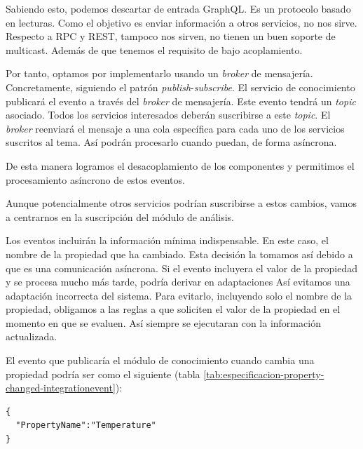 Sabiendo esto, podemos descartar de entrada GraphQL. Es un protocolo basado en lecturas. Como el objetivo es enviar información a otros servicios, no nos sirve. Respecto a RPC y REST, tampoco nos sirven, no tienen un buen soporte de multicast. Además de que tenemos el requisito de bajo acoplamiento.

Por tanto, optamos por implementarlo usando un \emph{broker} de mensajería. Concretamente, siguiendo el patrón \emph{publish}-\emph{subscribe}. El servicio de conocimiento publicará el evento a través del \emph{broker} de mensajería. Este evento tendrá un \emph{topic} asociado. Todos los servicios interesados deberán suscribirse a este \emph{topic}. El \emph{broker} reenviará el mensaje a una cola específica para cada uno de los servicios suscritos al tema. Así podrán procesarlo cuando puedan, de forma asíncrona.

De esta manera logramos el desacoplamiento de los componentes y permitimos el procesamiento asíncrono de estos eventos.

Aunque potencialmente otros servicios podrían suscribirse a estos cambios, vamos a centrarnos en la suscripción del módulo de análisis.

Los eventos incluirán la información mínima indispensable. En este caso, el nombre de la propiedad que ha cambiado. Esta decisión la tomamos así debido a que es una comunicación asíncrona. Si el evento incluyera el valor de la propiedad y se procesa mucho más tarde, podría derivar en adaptaciones Así evitamos una adaptación incorrecta del sistema. Para evitarlo, incluyendo solo el nombre de la propiedad, obligamos a las reglas a que soliciten el valor de la propiedad en el momento en que se evaluen. Así siempre se ejecutaran con la información actualizada.

El evento que publicaría el módulo de conocimiento cuando cambia una propiedad podría ser como el siguiente (tabla \ref{tab:especificacion-property-changed-integrationevent}):

\newsavebox\propertychangedeventbox
\begin{lrbox}{\propertychangedeventbox}
  \begin{minipage}[t]{2in}
    \begin{verbatim}
{
  "PropertyName":"Temperature"
}
        \end{verbatim}
  \end{minipage}
\end{lrbox}

